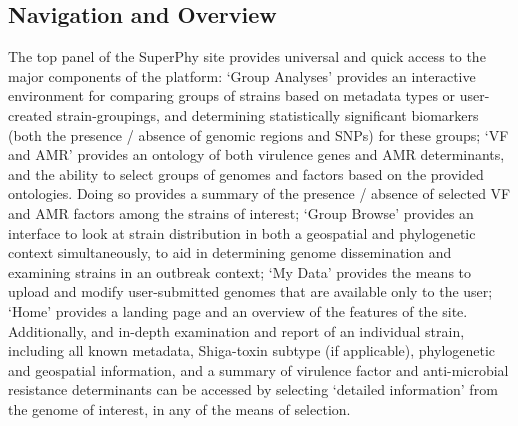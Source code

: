 \documentclass[doublespacing, linenumbers]{bmcart}
\begin{document}
\subsection{Navigation and Overview}
The top panel of the SuperPhy site provides universal and quick access to the major components of the platform: `Group Analyses' provides an interactive environment for comparing groups of strains based on metadata types or user-created strain-groupings, and determining statistically significant biomarkers (both the presence / absence of genomic regions and SNPs) for these groups; `VF and AMR' provides an ontology of both virulence genes and AMR determinants, and the ability to select groups of genomes and factors based on the provided ontologies. Doing so provides a summary of the presence / absence of selected VF and AMR factors among the strains of interest; `Group Browse' provides an interface to look at strain distribution in both a geospatial and phylogenetic context simultaneously, to aid in determining genome dissemination and examining strains in an outbreak context; `My Data' provides the means to upload and modify user-submitted genomes that are available only to the user; `Home' provides a landing page and an overview of the features of the site.  Additionally, and in-depth examination and report of an individual strain, including all known metadata, Shiga-toxin subtype (if applicable), phylogenetic and geospatial information, and a summary of virulence factor and anti-microbial resistance determinants can be accessed by selecting `detailed information' from the genome of interest, in any of the means of selection. 
\end{document}
